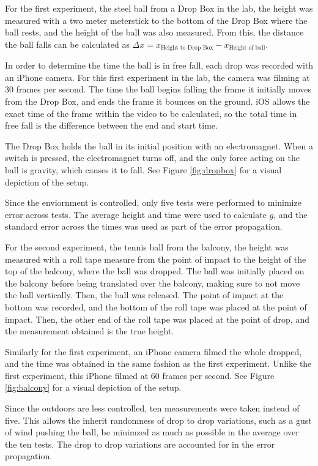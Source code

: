 \documentclass[12pt]{article}
\begin{document}
For the first experiment, the steel ball from a Drop Box in the lab, the height was measured with a two meter meterstick to the bottom of the Drop Box where the ball rests, and the height of the ball was also measured. From this, the distance the ball falls can be calculated as \(\Delta x = x_{\text{Height to Drop Box}} - x_{\text{Height of ball}}\).

In order to determine the time the ball is in free fall, each drop was recorded with an iPhone camera. For this first experiment in the lab, the camera was filming at 30 frames per second. The time the ball begins falling the frame it initially moves from the Drop Box, and ends the frame it bounces on the ground. iOS allows the exact time of the frame within the video to be calculated, so the total time in free fall is the difference between the end and start time.

The Drop Box holds the ball in its initial position with an electromagnet. When a switch is pressed, the electromagnet turns off, and the only force acting on the ball is gravity, which causes it to fall. See Figure \ref{fig:dropbox} for a visual depiction of the setup.

Since the enviornment is controlled, only five tests were performed to minimize error across tests. The average height and time were used to calculate \(g\), and the standard error across the times was used as part of the error propagation.

For the second experiment, the tennis ball from the balcony, the height was measured with a roll tape measure from the point of impact to the height of the top of the balcony, where the ball was dropped. The ball was initially placed on the balcony before being translated over the balcony, making sure to not move the ball vertically. Then, the ball was released. The point of impact at the bottom was recorded, and the bottom of the roll tape was placed at the point of impact. Then, the other end of the roll tape was placed at the point of drop, and the measurement obtained is the true height.

Similarly for the first experiment, an iPhone camera filmed the whole dropped, and the time was obtained in the same fashion as the first experiment. Unlike the first experiment, this iPhone filmed at 60 frames per second. See Figure \ref{fig:balcony} for a visual depiction of the setup.

Since the outdoors are less controlled, ten measurements were taken instead of five. This allows the inherit randomness of drop to drop variations, such as a gust of wind pushing the ball, be minimzed as much as possible in the average over the ten tests. The drop to drop variations are accounted for in the error propagation.
\end{document}
